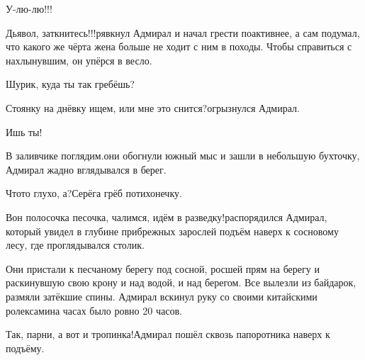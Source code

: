 \diagdash У-лю-лю!!!

\diagdash Дьявол, заткнитесь!!!\mdash рявкнул Адмирал и начал грести по\sdash активнее, а сам подумал, что какого же чёрта жена больше не ходит с ним в походы. Чтобы справиться с нахлынувшим, он упёрся в весло.

\diagdash Шурик, куда ты так гребёшь?

\diagdash Стоянку на днёвку ищем, или мне это снится?\mdash огрызнулся Адмирал.

\diagdash Ишь ты!

\diagdash В заливчике поглядим.\mdash они обогнули южный мыс и зашли в небольшую бухточку, Адмирал жадно вглядывался в берег.

\diagdash Что\sdash то глухо, а?\mdash Серёга грёб потихонечку.

\diagdash Вон полосочка песочка, чалимся, идём в разведку!\mdash распорядился Адмирал, который увидел в глубине прибрежных зарослей подъём наверх к сосновому лесу, где проглядывался столик.

Они пристали к песчаному берегу под сосной, росшей прям на берегу и раскинувшую свою крону и над водой, и над берегом. Все вылезли из байдарок, размяли затёкшие спины. Адмирал вскинул руку со своими китайскими ролексами\mdash на часах было ровно 20 часов.

\diagdash Так, парни, а вот и тропинка!\mdash Адмирал пошёл сквозь папоротника наверх к подъёму.


















\begin{center}
\end{center}

